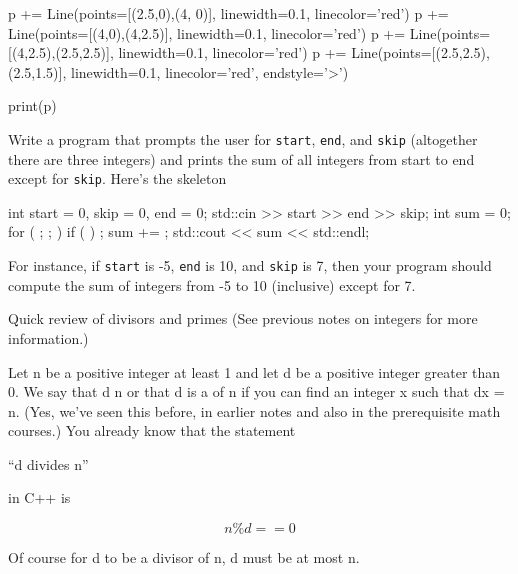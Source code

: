 \begin{console}
\begin{python}
p += Line(points=[(2.5,0),(4, 0)], linewidth=0.1, linecolor='red')
p += Line(points=[(4,0),(4,2.5)], linewidth=0.1, linecolor='red')
p += Line(points=[(4,2.5),(2.5,2.5)], linewidth=0.1, linecolor='red')
p += Line(points=[(2.5,2.5),(2.5,1.5)], linewidth=0.1, linecolor='red', endstyle='>')

print(p)
\end{python}

\begin{ex}
Write a program that prompts the user for \texttt{start}, \texttt{end}, and \texttt{skip} (altogether there are three integers) and prints the sum of all integers from start to end except for \texttt{skip}. Here's the skeleton
\begin{console}
int start = 0, skip = 0, end = 0;
std::cin >> start >> end >> skip;
int sum = 0;
for (         ;          ;          )
{   
    if (          )          ;
    sum +=          ;
}
std::cout << sum << std::endl;
\end{console}
For instance, if \texttt{start} is -5, \texttt{end} is 10, and \texttt{skip}
is 7, then your program should compute the sum of integers from -5 to 10
(inclusive) except for 7.
\end{ex}

\newpage{}

Quick review of divisors and primes (See previous notes on integers for
more information.)

Let n be a positive integer at least 1 and let d be a positive integer
greater than 0. We say that d  n or that d is a
 of n if you can find an integer x such that dx = n.
(Yes, we've seen this before, in earlier notes and also
in the prerequisite math courses.) You already know that the statement
\begin{center}
``d divides n''
\end{center}
in C++ is

\[n \% d == 0\]

Of course for d to be a divisor of n, d must be at most n.


\end{console}
